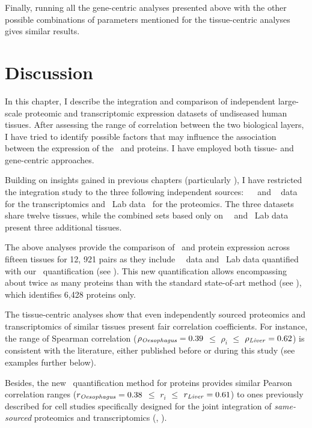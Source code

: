 Finally, running all the gene-centric analyses presented above
with the other possible combinations of parameters
mentioned for the tissue-centric analyses
gives similar results.\mybr\

\vspace{-2mm}
\section{Discussion}
\vspace{-2mm}

In this chapter,
I describe the integration and comparison of independent large-scale
proteomic and transcriptomic expression datasets
of undiseased human tissues.
After assessing the range of correlation between the two biological layers,
I have tried to identify possible factors
that may influence the association
between the expression of the \mRNAs\ and proteins.
I have employed both tissue- and gene-centric approaches.\mybr\

Building on insights gained in previous chapters
(particularly ),
I have restricted the integration study to
the three following independent sources:
\uhlen\ \etal{}~
and \gtex~ data for the transcriptomics
and \pandey\ Lab data~ for the proteomics.
The three datasets share twelve tissues,
while the combined sets based only on \uhlen\ \etal\ and \pandey\ Lab data
present three additional tissues.\mybr\

The above analyses provide
the comparison of \mRNA\ and protein expression across fifteen tissues
for 12, 921 pairs as they include \uhlen\ \etal\ data and \pandey\ Lab data
quantified with our \PPKM\ quantification (see ).
This new quantification allows encompassing about twice as many proteins
than with the standard state-of-art method (see ),
which identifies 6,428 proteins only.\mybr\

The tissue-centric analyses show that
even independently sourced proteomics and transcriptomics of similar tissues
present fair correlation coefficients.
For instance, the range of Spearman correlation
($\rho_{\text{\emph{Oesophagus}}}=0.39$
$≤$ $\rho_i$ $≤$ $\rho_{\text{\emph{Liver}}}=0.62$)
is consistent with the literature,
either published before or during this study (see examples further below).\mybr\

Besides, the new \PPKM\ quantification method for proteins%
 provides similar Pearson correlation ranges
($r_{\text{\emph{Oesophagus}}}=0.38$ $≤$ $r_i$  $≤$ $r_{\text{\emph{Liver}}}=0.61$)
to ones previously described for cell studies specifically designed
for the joint integration of \emph{same-sourced} proteomics and transcriptomics
(\eg, \citet{Marguerat2012-sn,schwanhausserglobal:2011,Schwanhausser2013-et,Li2014-ai}).\mybr\

